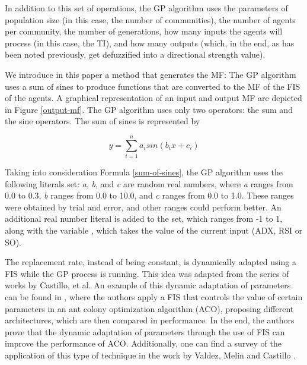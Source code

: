 \documentclass[a4paper,twoside]{article}
\begin{document}
In addition to this set of operations, the GP algorithm uses the
parameters of population size (in this case, the number of
communities), the number of agents per community, the number of
generations, how many inputs the agents will process (in this case,
the TI), and how many outputs (which, in the end, as has been noted
previously, get defuzzified into a directional strength value). %



We introduce in this paper a method  that generates the MF: The GP algorithm uses a sum of
sines to produce functions that are converted to the MF of the FIS of
the agents. A graphical representation of an input and output MF 
are depicted in Figure \ref{output-mf}. The GP algorithm uses only two operators: the sum and
the sine operators. The sum of sines is represented by

\begin{equation} \label{sum-of-sines}
  y = \sum_{i=1}^{n} a_{i} sin(b_{i}x + c_{i})
\end{equation}

Taking into consideration Formula \ref{sum-of-sines}, the GP algorithm
uses the following literals set: \textit{a}, \textit{b}, and
\textit{c} are random real numbers, where \textit{a} ranges from 0.0
to 0.3, \textit{b} ranges from 0.0 to 10.0, and \textit{c} ranges from
0.0 to 1.0. These ranges were obtained by trial and error, and other
ranges could perform better. An additional real number literal is
added to the set, which ranges from -1 to 1, along with the variable
, which takes the value of the current input (ADX, RSI or
SO). 


The replacement rate, instead of being constant, is
dynamically adapted using a FIS while the GP process is running. This
idea was adapted from the series of works by Castillo, et al. An
example of this dynamic adaptation of parameters can be found in
\cite{castillo2015new}, where the authors apply a FIS that controls
the value of certain parameters in an ant colony optimization
algorithm (ACO), proposing different architectures, which are then
compared in performance. In the end, the authors
prove that the dynamic adaptation of parameters through the use of FIS
can improve the performance of ACO. Additionally, one can find a
survey of the application of this type of technique in the work by
Valdez, Melin and Castillo \cite{valdez2014survey}. 
\end{document}

